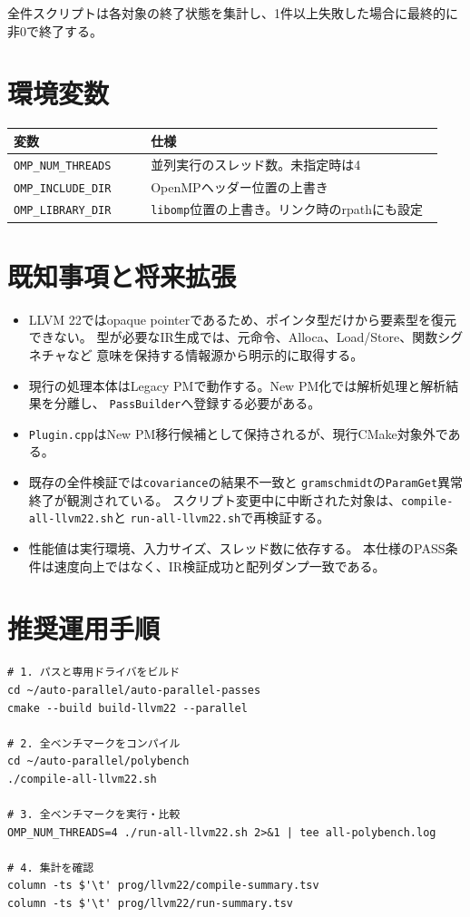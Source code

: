 \documentclass[a4paper,11pt]{ltjsarticle}
\begin{document}
全件スクリプトは各対象の終了状態を集計し、1件以上失敗した場合に最終的に非0で終了する。

\section{環境変数}
\begin{longtable}{p{0.30\linewidth}p{0.64\linewidth}}
\toprule
変数 & 仕様 \\
\midrule
\endhead
\texttt{OMP\_NUM\_THREADS} & 並列実行のスレッド数。未指定時は4 \\
\texttt{OMP\_INCLUDE\_DIR} & OpenMPヘッダー位置の上書き \\
\texttt{OMP\_LIBRARY\_DIR} & \texttt{libomp}位置の上書き。リンク時のrpathにも設定 \\
\bottomrule
\end{longtable}

\section{既知事項と将来拡張}
\begin{itemize}
  \item LLVM 22ではopaque pointerであるため、ポインタ型だけから要素型を復元できない。
        型が必要なIR生成では、元命令、Alloca、Load/Store、関数シグネチャなど
        意味を保持する情報源から明示的に取得する。
  \item 現行の処理本体はLegacy PMで動作する。New PM化では解析処理と解析結果を分離し、
        \texttt{PassBuilder}へ登録する必要がある。
  \item \texttt{Plugin.cpp}はNew PM移行候補として保持されるが、現行CMake対象外である。
  \item 既存の全件検証では\texttt{covariance}の結果不一致と
        \texttt{gramschmidt}の\texttt{ParamGet}異常終了が観測されている。
        スクリプト変更中に中断された対象は、\texttt{compile-all-llvm22.sh}と
        \texttt{run-all-llvm22.sh}で再検証する。
  \item 性能値は実行環境、入力サイズ、スレッド数に依存する。
        本仕様のPASS条件は速度向上ではなく、IR検証成功と配列ダンプ一致である。
\end{itemize}

\section{推奨運用手順}
\begin{lstlisting}
# 1. パスと専用ドライバをビルド
cd ~/auto-parallel/auto-parallel-passes
cmake --build build-llvm22 --parallel

# 2. 全ベンチマークをコンパイル
cd ~/auto-parallel/polybench
./compile-all-llvm22.sh

# 3. 全ベンチマークを実行・比較
OMP_NUM_THREADS=4 ./run-all-llvm22.sh 2>&1 | tee all-polybench.log

# 4. 集計を確認
column -ts $'\t' prog/llvm22/compile-summary.tsv
column -ts $'\t' prog/llvm22/run-summary.tsv
\end{lstlisting}
\end{document}
